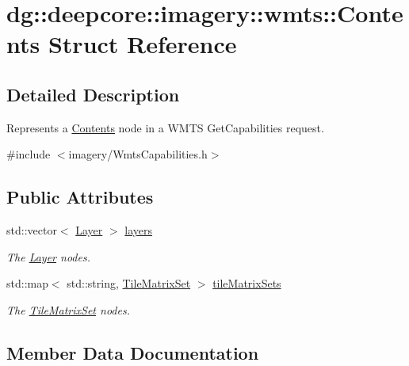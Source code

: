 \hypertarget{structdg_1_1deepcore_1_1imagery_1_1wmts_1_1_contents}{}\section{dg\+:\+:deepcore\+:\+:imagery\+:\+:wmts\+:\+:Contents Struct Reference}
\label{structdg_1_1deepcore_1_1imagery_1_1wmts_1_1_contents}


\subsection{Detailed Description}
Represents a \hyperlink{structdg_1_1deepcore_1_1imagery_1_1wmts_1_1_contents}{Contents} node in a W\+M\+TS Get\+Capabilities request. 

{\ttfamily \#include $<$imagery/\+Wmts\+Capabilities.\+h$>$}

\subsection*{Public Attributes}
\begin{DoxyCompactItemize}
\item 
std\+::vector$<$ \hyperlink{structdg_1_1deepcore_1_1imagery_1_1wmts_1_1_layer}{Layer} $>$ \hyperlink{structdg_1_1deepcore_1_1imagery_1_1wmts_1_1_contents_ac634257db9b4a3bcfd653425212d7eb2}{layers}
\begin{DoxyCompactList}\small\item\em The \hyperlink{structdg_1_1deepcore_1_1imagery_1_1wmts_1_1_layer}{Layer} nodes. \end{DoxyCompactList}\item 
std\+::map$<$ std\+::string, \hyperlink{structdg_1_1deepcore_1_1imagery_1_1wmts_1_1_tile_matrix_set}{Tile\+Matrix\+Set} $>$ \hyperlink{structdg_1_1deepcore_1_1imagery_1_1wmts_1_1_contents_afa21421460450c381d86310758710a51}{tile\+Matrix\+Sets}
\begin{DoxyCompactList}\small\item\em The \hyperlink{structdg_1_1deepcore_1_1imagery_1_1wmts_1_1_tile_matrix_set}{Tile\+Matrix\+Set} nodes. \end{DoxyCompactList}\end{DoxyCompactItemize}


\subsection{Member Data Documentation}
